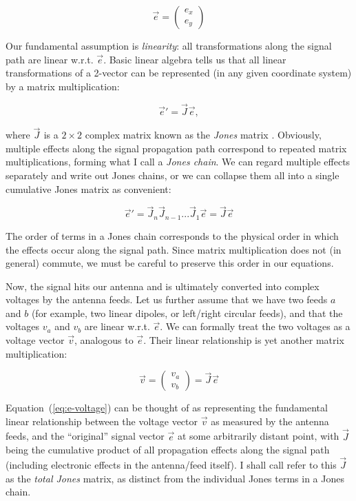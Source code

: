 \documentclass{aa}
\newcommand{\jones}[2]{\vec {#1}_{#2}}
\begin{document}
\[
\vec e = \left( \begin{array}{c}e_x\\e_y\end{array} \right) 
\]

Our fundamental assumption is {\em linearity}: all transformations along the signal path are linear w.r.t. $\vec e$. Basic linear algebra tells us that all linear transformations of a 2-vector can be represented (in any given coordinate system) by a matrix multiplication:

\[
\vec e' = \jones{J}{} \vec e,
\]

where $\jones{J}{}$ is a $2\times2$ complex matrix known as the {\em Jones} matrix \citep{jones}. Obviously, multiple effects along the signal propagation path correspond to repeated matrix multiplications, forming what I call a {\em Jones chain}. We can regard multiple effects separately and write out Jones chains, or we can collapse them all into a single cumulative Jones matrix as convenient:

\begin{equation}\label{eq:jones-chain}
\vec e' = \jones{J}{n} \jones{J}{n-1} ... \jones{J}{1} \vec e = \jones{J}{} \vec e
\end{equation}

The order of terms in a Jones chain corresponds to the physical order in which the effects occur along the signal path. Since matrix multiplication does not (in general) commute, we must be careful to preserve this order in our equations.

Now, the signal hits our antenna and is ultimately converted into complex voltages by the antenna feeds. Let us further assume that we have two feeds $a$ and $b$ (for example, two linear dipoles, or left/right circular feeds), and that the voltages $v_a$ and $v_b$ are linear w.r.t. $\vec e$. We can formally treat the two voltages as a voltage vector $\vec v$, analogous to $\vec e$. Their linear relationship is yet another matrix multiplication:

\begin{equation}\label{eq:e-voltage}
\vec v = \left( \begin{array}{c}v_a\\v_b\end{array} \right) = \jones{J}{} \vec e
\end{equation}
 
Equation~(\ref{eq:e-voltage}) can be thought of as representing the fundamental linear relationship between the voltage vector $\vec v$ as measured by the antenna feeds, and the ``original'' signal vector $\vec e$ at some arbitrarily distant point, with $\jones{J}{}$ being the cumulative product of all propagation effects along the signal path (including electronic effects in the antenna/feed itself). I shall call refer to this $\jones{J}{}$ as the {\em total Jones} matrix, as distinct from the individual Jones terms in a Jones chain.
\end{document}
